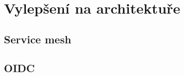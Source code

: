 \documentclass[thesis=M,czech]{FITthesis}[2019/12/23]
\theoremstyle{plain}
\theoremstyle{definition}
\begin{document}
\section{Vylepšení na architektuře}


\subsection{Service mesh}


\subsection{OIDC}




\begin{conclusion}
\end{conclusion}




\end{document}
